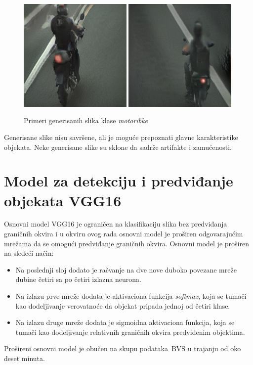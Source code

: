 \documentclass[12pt,oneside]{memoir}
\newcommand{\bvs}{\ensuremath{\,\textrm{BVS}}}
\begin{document}
\begin{figure}[!htbp]
\centering
    \includegraphics[width=0.49\textwidth]{matfmaster/stylegan/motorbike/image2.png}
    \includegraphics[width=0.49\textwidth]{matfmaster/stylegan/motorbike/image9.png}
\caption{Primeri generisanih slika klase \textit{motoribke}}
\label{fig:section4_stylegan_motorbike_images}
\end{figure}

Generisane slike nisu savršene, ali je moguće prepoznati glavne karakteristike objekata. Neke generisane slike su sklone da sadrže artifakte i zamućenosti.


\section{Model za detekciju i predviđanje objekata VGG16}

Osnovni model VGG16 je ograničen na klasifikaciju slika bez predviđanja graničnih okvira i u okviru ovog rada osnovni model je proširen odgovarajućim mrežama da se omogući predviđanje graničnih okvira. Osnovni model je proširen na sledeći način:
\begin{itemize}
\item Na poslednji sloj dodato je račvanje na dve nove duboko povezane mreže dubine četiri sa po četiri izlazna neurona.
\item Na izlazu prve mreže dodata je aktivaciona funkcija \textit{softmax}, koja se tumači kao dodeljivanje verovatnoće da objekat pripada jednoj od četiri klase.
\item Na izlazu druge mreže dodata je sigmoidna aktivaciona funkcija, koja se tumači kao dodeljivanje relativnih graničnih okvira predviđenim objektima.
\end{itemize}
Prošireni osnovni model je obučen na skupu podataka \bvs{} u trajanju od oko deset minuta.
\end{document}
